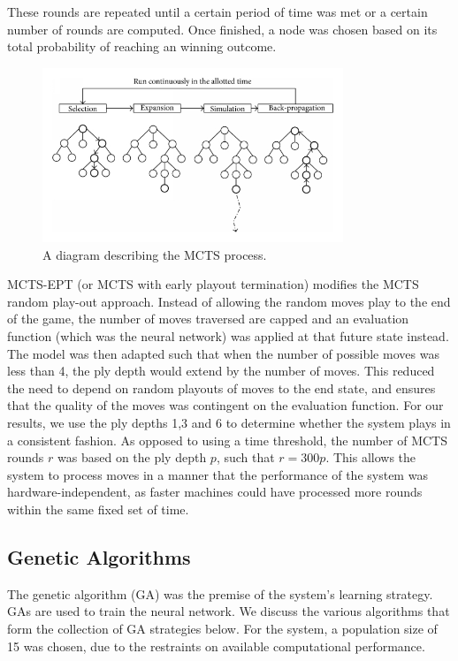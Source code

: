 \documentclass[12pt,a4paper]{article}
\begin{document}
        These rounds are repeated until a certain period of time was met or a certain number of rounds are computed. Once finished, a node was chosen based on its total probability of reaching an winning outcome.

        \begin{figure}[!ht]
            \centering
            \includegraphics[width=90mm]{images/montecarlo.png}
            \caption{A diagram describing the MCTS process.}
        \end{figure}

        MCTS-EPT (or MCTS with early playout termination) modifies the MCTS random play-out approach. Instead of allowing the random moves play to the end of the game, the number of moves traversed are capped and an evaluation function (which was the neural network) was applied at that future state instead. \cite{lorentz_using_2016} The model was then adapted such that when the number of possible moves was less than 4, the ply depth would extend by the number of moves. This reduced the need to depend on random playouts of moves to the end state, and ensures that the quality of the moves was contingent on the evaluation function. For our results, we use the ply depths 1,3 and 6 to determine whether the system plays in a consistent fashion. As opposed to using a time threshold, the number of MCTS rounds $r$ was based on the ply depth $p$, such that $r=300p$. This allows the system to process moves in a manner that the performance of the system was hardware-independent, as faster machines could have processed more rounds within the same fixed set of time.



    \subsection{Genetic Algorithms}
        The genetic algorithm (GA) was the premise of the system's learning strategy. GAs are used to train the neural network. We discuss the various algorithms that form the collection of GA strategies below. For the system, a population size of 15 was chosen, due to the restraints on available computational performance.
\end{document}
